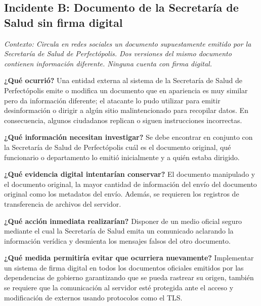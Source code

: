 \subsection*{Incidente B: Documento de la Secretaría de Salud sin firma digital}
\textit{Contexto: Circula en redes sociales un documento supuestamente emitido por la Secretaría de Salud de Perfectópolis. Dos versiones del mismo documento contienen información diferente. Ninguna cuenta con firma digital.}

\begin{enumerateColor}
    \item \textbf{¿Qué ocurrió?}
	    Una entidad externa al sistema de la Secretaría de Salud de Perfectópolis emite o modifica un documento que en apariencia es muy similar pero da información diferente; el atacante lo pudo utilizar para emitir desinformación o dirigir a algún sitio malintencionado para recopilar datos. En consecuencia, algunos ciudadanos replican o siguen instrucciones incorrectas.

    \item \textbf{¿Qué información necesitan investigar?}
	    Se debe encontrar en conjunto con la Secretaría de Salud de Perfectópolis cuál es el documento original, qué funcionario o departamento lo emitió inicialmente y a quién estaba dirigido.

    \item \textbf{¿Qué evidencia digital intentarían conservar?}
	    El documento manipulado y el documento original, la mayor cantidad de información del envío del documento original como los metadatos del envío. Además, se requieren los registros de transferencia de archivos del servidor.

    \item \textbf{¿Qué acción inmediata realizarían?}
	    Disponer de un medio oficial seguro mediante el cual la Secretaría de Salud emita un comunicado aclarando la información verídica y desmienta los mensajes falsos del otro documento.

    \item \textbf{¿Qué medida permitiría evitar que ocurriera nuevamente?}
	    Implementar un sistema de firma digital en todos los documentos oficiales emitidos por las dependencias de gobierno garantizando que se pueda rastrear su origen, también se requiere que la comunicación al servidor esté protegida ante el acceso y modificación de externos usando protocolos como el TLS.
\end{enumerateColor}

